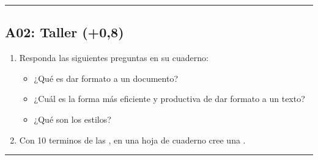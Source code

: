 \documentclass[letterpaper,10pt,spanish]{sphinxmanual}
\begin{document}
\bigskip\hrule\bigskip



\subsection{A02: Taller (+0,8)}
\label{\detokenize{1_guias/10ofimatica/G1014:a02-taller-0-8}}
\sphinxAtStartPar
{}
\begin{enumerate}
%
\item {} 
\sphinxAtStartPar
Responda las siguientes preguntas en su cuaderno:
\begin{itemize}
\item {} 
\sphinxAtStartPar
¿Qué es dar formato a un documento?

\item {} 
\sphinxAtStartPar
¿Cuál es la forma más eficiente y productiva de dar formato a un texto?

\item {} 
\sphinxAtStartPar
¿Qué son los estilos?

\end{itemize}

\item {} 
\sphinxAtStartPar
Con 10 terminos de las , en una hoja de cuaderno cree una .

\end{enumerate}


\bigskip\hrule\bigskip
\end{document}
